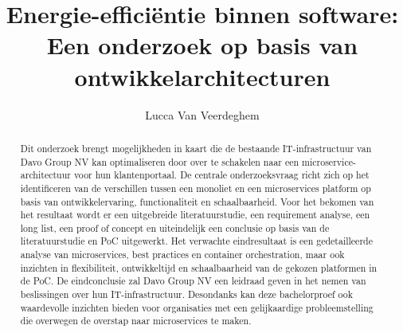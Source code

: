 \documentclass{hogent-article}
\title{Energie-efficiëntie binnen software: Een onderzoek op basis van ontwikkelarchitecturen}
\author{Lucca Van Veerdeghem}
\begin{document}
\begin{abstract}

    
    
Dit onderzoek brengt mogelijkheden in kaart die de bestaande IT-infrastructuur van Davo Group NV kan optimaliseren door over te schakelen naar een microservice-architectuur voor hun klantenportaal. De centrale onderzoeksvraag richt zich op het identificeren van de verschillen tussen een monoliet en een microservices platform op basis van ontwikkelervaring, functionaliteit en schaalbaarheid. Voor het bekomen van het resultaat wordt er een uitgebreide literatuurstudie, een requirement analyse, een long list, een proof of concept en uiteindelijk een conclusie op basis van de literatuurstudie en PoC uitgewerkt. Het verwachte eindresultaat is een gedetailleerde analyse van microservices, best practices en container orchestration, maar ook inzichten in flexibiliteit, ontwikkeltijd en schaalbaarheid van de gekozen platformen in de PoC. De eindconclusie zal Davo Group NV een leidraad geven in het nemen van beslissingen over hun IT-infrastructuur. Desondanks kan deze bachelorproef ook waardevolle inzichten bieden voor organisaties met een gelijkaardige probleemstelling die overwegen de overstap naar microservices te maken.
    
\end{abstract}

\tableofcontents



\printbibliography[heading=bibintoc]
\end{document}
